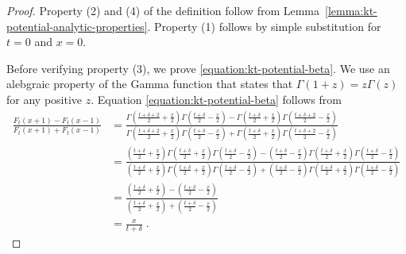 \begin{proof}
Property (2) and (4) of the definition follow from
Lemma~\ref{lemma:kt-potential-analytic-properties}.
Property (1) follows by simple substitution for $t=0$ and $x=0$.

Before verifying property (3), we prove \eqref{equation:kt-potential-beta}. We
use an alebgraic property of the Gamma function that states that $\Gamma(1+z) =
z \Gamma(z)$ for any positive $z$. Equation \eqref{equation:kt-potential-beta}
follows from
\begin{align*}
\frac{F_t(x + 1) - F_t(x - 1)}{F_t(x + 1) + F_t(x - 1)}
& = \frac{\Gamma(\frac{t+\delta+2}{2} + \frac{x}{2}) \Gamma(\frac{t+\delta}{2} - \frac{x}{2}) - \Gamma(\frac{t+\delta}{2} + \frac{x}{2}) \Gamma(\frac{t+\delta+2}{2} - \frac{x}{2})}{\Gamma(\frac{t+\delta+2}{2} + \frac{x}{2}) \Gamma(\frac{t + \delta}{2} - \frac{x}{2}) + \Gamma(\frac{t + \delta}{2} + \frac{x}{2}) \Gamma(\frac{t+\delta+2}{2} - \frac{x}{2})} \\
& = \frac{(\frac{t+\delta}{2} + \frac{x}{2})\Gamma(\frac{t+\delta}{2} + \frac{x}{2}) \Gamma(\frac{t+\delta}{2} - \frac{x}{2}) - (\frac{t+\delta}{2} - \frac{x}{2})\Gamma(\frac{t+\delta}{2} + \frac{x}{2}) \Gamma(\frac{t+\delta}{2} - \frac{x}{2})}{(\frac{t+\delta}{2} + \frac{x}{2})\Gamma(\frac{t+\delta}{2} + \frac{x}{2}) \Gamma(\frac{t+\delta}{2} - \frac{x}{2}) + (\frac{t+\delta}{2} - \frac{x}{2})\Gamma(\frac{t+\delta}{2} + \frac{x}{2}) \Gamma(\frac{t+\delta}{2} - \frac{x}{2})} \\
& = \frac{(\frac{t+\delta}{2} + \frac{x}{2}) - (\frac{t+\delta}{2} - \frac{x}{2})}{(\frac{t+\delta}{2} + \frac{x}{2}) + (\frac{t+\delta}{2} - \frac{x}{2})} \\
& = \frac{x}{t+\delta} \; .
\end{align*}


\end{proof}
